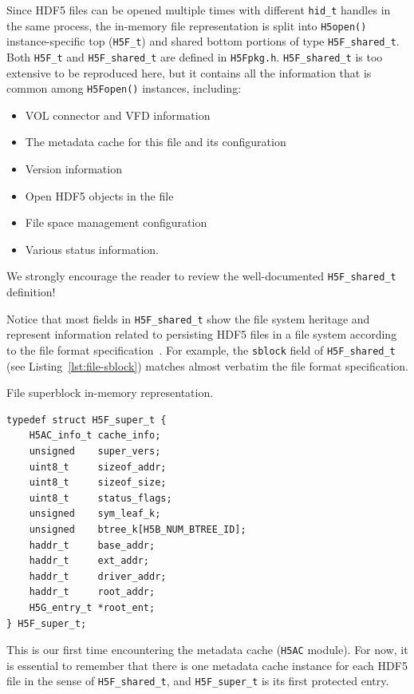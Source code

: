 Since HDF5 files can be opened multiple times with different \texttt{hid\_t} handles in the same process, the in-memory file representation is split into \texttt{H5open()} instance-specific top (\texttt{H5F\_t}) and shared bottom portions of type \texttt{H5F\_shared\_t}. Both \texttt{H5F\_t} and \texttt{H5F\_shared\_t} are defined in \texttt{H5Fpkg.h}. \texttt{H5F\_shared\_t} is too extensive to be reproduced here, but it contains all the information that is common among \texttt{H5Fopen()} instances, including:

 \begin{itemize}
     \item VOL connector and VFD information
     \item The metadata cache for this file and its configuration
     \item Version information
     \item Open HDF5 objects in the file
     \item File space management configuration
     \item Various status information.
 \end{itemize}
We strongly encourage the reader to review the well-documented \texttt{H5F\_shared\_t} definition!
 
Notice that most fields in \texttt{H5F\_shared\_t} show the file system heritage and represent information related to persisting HDF5 files in a file system according to the file format specification~\cite{ffmt}. For example, the \texttt{sblock} field of \texttt{H5F\_shared\_t} (see Listing~\ref{lst:file-sblock}) matches almost verbatim the file format specification.

\begin{listing}
\centering
\caption{File superblock in-memory representation.}
\label{lst:file-sblock}
\begin{verbatim}
typedef struct H5F_super_t {
    H5AC_info_t cache_info;
    unsigned    super_vers;
    uint8_t     sizeof_addr;
    uint8_t     sizeof_size;
    uint8_t     status_flags;
    unsigned    sym_leaf_k;
    unsigned    btree_k[H5B_NUM_BTREE_ID];
    haddr_t     base_addr;
    haddr_t     ext_addr;
    haddr_t     driver_addr;
    haddr_t     root_addr;
    H5G_entry_t *root_ent;
} H5F_super_t;
\end{verbatim}
\end{listing}

This is our first time encountering the metadata cache (\texttt{H5AC} module). For now, it is essential to remember that there is one metadata cache instance for each HDF5 file in the sense of \texttt{H5F\_shared\_t}, and \texttt{H5F\_super\_t} is its first protected entry.

